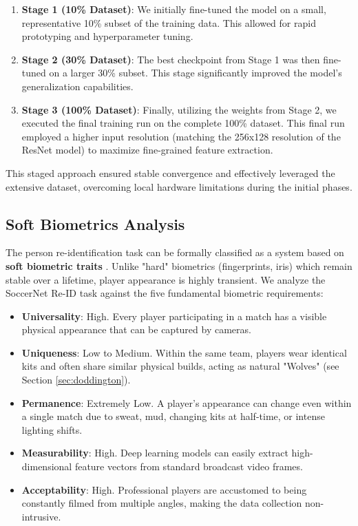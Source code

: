 \documentclass[10pt,twocolumn,letterpaper]{article}
\begin{document}
\begin{enumerate}
    \item \textbf{Stage 1 (10\% Dataset)}: We initially fine-tuned the model on a small, representative 10\% subset of the training data. This allowed for rapid prototyping and hyperparameter tuning.
    \item \textbf{Stage 2 (30\% Dataset)}: The best checkpoint from Stage 1 was then fine-tuned on a larger 30\% subset. This stage significantly improved the model's generalization capabilities.
    \item \textbf{Stage 3 (100\% Dataset)}: Finally, utilizing the weights from Stage 2, we executed the final training run on the complete 100\% dataset. This final run employed a higher input resolution (matching the 256x128 resolution of the ResNet model) to maximize fine-grained feature extraction.
\end{enumerate}

This staged approach ensured stable convergence and effectively leveraged the extensive dataset, overcoming local hardware limitations during the initial phases.

\subsection{Soft Biometrics Analysis}
The person re-identification task can be formally classified as a system based on \textbf{soft biometric traits} \cite{jain2004introduction}. Unlike "hard" biometrics (fingerprints, iris) which remain stable over a lifetime, player appearance is highly transient. We analyze the SoccerNet Re-ID task against the five fundamental biometric requirements:

\begin{itemize}
    \item \textbf{Universality}: High. Every player participating in a match has a visible physical appearance that can be captured by cameras.
    \item \textbf{Uniqueness}: Low to Medium. Within the same team, players wear identical kits and often share similar physical builds, acting as natural "Wolves" (see Section \ref{sec:doddington}).
    \item \textbf{Permanence}: Extremely Low. A player's appearance can change even within a single match due to sweat, mud, changing kits at half-time, or intense lighting shifts.
    \item \textbf{Measurability}: High. Deep learning models can easily extract high-dimensional feature vectors from standard broadcast video frames.
    \item \textbf{Acceptability}: High. Professional players are accustomed to being constantly filmed from multiple angles, making the data collection non-intrusive.
\end{itemize}
\end{document}

